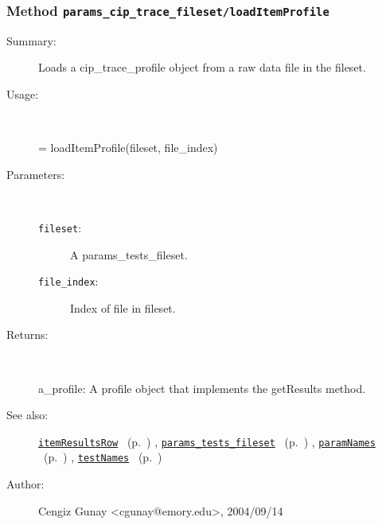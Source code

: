 \subsubsection[Method \texttt{loadItemProfile}]{Method \texttt{params\_cip\_trace\_fileset/loadItemProfile}}%
%
\label{ref_params_cip_trace_fileset__loadItemProfile}%
\hypertarget{ref_params_cip_trace_fileset__loadItemProfile}{}%
\begin{description}
\item[Summary:]Loads a cip\_trace\_profile object from a raw data file in the fileset.
%
\item[Usage:]~%
\begin{lyxcode}%
[params\_row, tests\_row] = loadItemProfile(fileset, file\_index)
%
\end{lyxcode}%
%
%
\item[Parameters:]~
\begin{description}%
\item[\texttt{fileset}:]
 A params\_tests\_fileset.
\item[\texttt{file\_index}:]
 Index of file in fileset.
\end{description}%
%
\item[Returns:]~

	a\_profile: A profile object that implements the getResults method.
%
%
\item[See also:]%
\hyperlink{ref_itemResultsRow}{\texttt{itemResultsRow}}%
\ (p.~\pageref{ref_itemResultsRow})%
%
, \hyperlink{ref_params_tests_fileset}{\texttt{params\_tests\_fileset}}%
\ (p.~\pageref{ref_params_tests_fileset})%
%
, \hyperlink{ref_paramNames}{\texttt{paramNames}}%
\ (p.~\pageref{ref_paramNames})%
%
, \hyperlink{ref_testNames}{\texttt{testNames}}%
\ (p.~\pageref{ref_testNames})%
%
%
\item[Author:]%
Cengiz Gunay <cgunay@emory.edu>, 2004/09/14%
\end{description}
\methodline%
